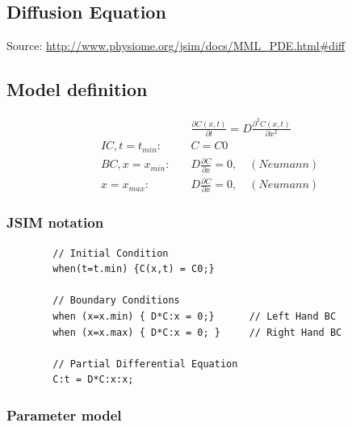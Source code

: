 \bigskip
\subsection{Diffusion Equation}
\label{sec:diffusionEq}
Source: \url{http://www.physiome.org/jsim/docs/MML_PDE.html#diff}

\subsection*{Model definition}

\begin{align}
& \frac{\partial C(x,t)}{\partial t}  = D \frac{\partial^2 C(x,t)}{\partial x^2} \nonumber \\
IC, t=t_{min}: \quad & C =  C0 \nonumber \\
BC, x=x_{min}: \quad & D \frac{\partial C}{\partial x} = 0, \quad (Neumann) \nonumber \\
	x=x_{max}: \quad & D \frac{\partial C}{\partial x} = 0 , \quad (Neumann) \nonumber
\end{align}

\subsubsection*{JSIM notation}

\lstset{language=MLX}
\begin{lstlisting}
        // Initial Condition
        when(t=t.min) {C(x,t) = C0;}
        
        // Boundary Conditions
        when (x=x.min) { D*C:x = 0;}      // Left Hand BC
        when (x=x.max) { D*C:x = 0; }     // Right Hand BC
        
        // Partial Differential Equation
        C:t = D*C:x:x;
\end{lstlisting}

\bigskip
\subsubsection*{Parameter model}

